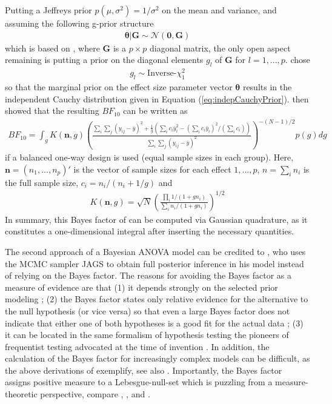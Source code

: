 Putting a Jeffreys prior $p(\mu,\sigma^2)=1/\sigma^2$ on the mean and variance, and assuming the following g-prior structure
\begin{align}
	\boldsymbol{\theta}|\boldsymbol{G}\sim \mathcal{N}(\boldsymbol{0},\boldsymbol{G})	
\end{align}
which is based on \cite{Zellner1980}, where $\boldsymbol{G}$ is a $p\times p$ diagonal matrix, the only open aspect remaining is putting a prior on the diagonal elements $g_l$ of $\boldsymbol{G}$ for $l=1,...,p$. \citep{Rouder2012} chose
\begin{align}
	g_l \sim \text{Inverse-}\chi_1^2	
\end{align}
so that the marginal prior on the effect size parameter vector $\boldsymbol{\theta}$ results in the independent Cauchy distribution given in Equation (\ref{eq:indepCauchyPrior}). \cite{Rouder2012} then showed that the resulting $BF_{10}$ can be written as
\begin{align}
	BF_{10}=\int_g K(\boldsymbol{n},g)\left ( \frac{\sum_{i} \sum_{j}(y_{ij}-\bar{y})^2+\frac{1}{g}(\sum_{i}c_i \bar{y}_i^2-(\sum_{i}c_i \bar{y}_i)^2 / (\sum_{i}c_i))}{\sum_{i} \sum_{j}(y_{ij}-\bar{y})^2}\right )^{-(N-1)/2}p(g)dg
\end{align}
if a balanced one-way design is used (equal sample sizes in each group). Here, $\boldsymbol{n}=(n_1,...,n_p)'$ is the vector of sample sizes for each effect $1,...,p$, $n=\sum_i n_i$ is the full sample size, $c_i=n_i/(n_i+1/g)$ and
\begin{align}
	K(\boldsymbol{n},g)=\sqrt{N}\left ( \frac{\prod_i 1/(1+gn_i)}{\sum_i n_i/(1+gn_i)} \right )^{1/2}	
\end{align}
In summary, this Bayes factor of \cite{Rouder2012} can be computed via Gaussian quadrature, as it constitutes a one-dimensional integral after inserting the necessary quantities.

The second approach of a Bayesian ANOVA model can be credited to \cite{Kruschke2015}, who uses the MCMC sampler JAGS \citep{Plummer2003} to obtain full posterior inference in his model instead of relying on the Bayes factor. The reasons for avoiding the Bayes factor as a measure of evidence are that (1) it depends strongly on the selected prior modeling \citep{Kamary2014}; (2) the Bayes factor states only relative evidence for the alternative to the null hypothesis (or vice versa) so that even a large Bayes factor does not indicate that either one of both hypotheses is a good fit for the actual data \citep{Kelter2020BMCJasp,Kelter2020BayesianPosteriorIndices}; (3) it can be located in the same formalism of hypothesis testing the pioneers of frequentist testing advocated at the time of invention \citep{Robert2016,Tendeiro2019}. In addition, the calculation of the Bayes factor for increasingly complex models can be difficult, as the above derivations of \cite{Rouder2012} exemplify, see also \cite{Kamary2014}. Importantly, the Bayes factor assigns positive measure to a Lebesgue-null-set which is puzzling from a measure-theoretic perspective, compare \cite{Kelter2021ComputationalBrainAndBehavior}, \cite{Rao2016}, and \cite{Berger1985}.

